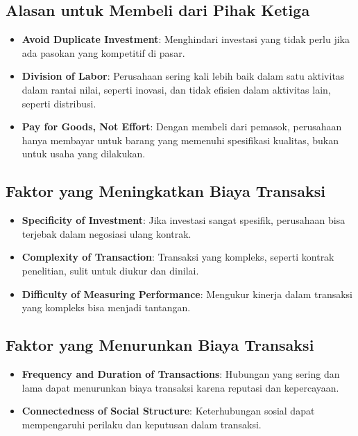 \documentclass{article}
\begin{document}
\subsection{Alasan untuk Membeli dari Pihak Ketiga}
\begin{itemize}
    \item \textbf{Avoid Duplicate Investment}: Menghindari investasi yang tidak perlu jika ada pasokan yang kompetitif di pasar.
    \item \textbf{Division of Labor}: Perusahaan sering kali lebih baik dalam satu aktivitas dalam rantai nilai, seperti inovasi, dan tidak efisien dalam aktivitas lain, seperti distribusi.
    \item \textbf{Pay for Goods, Not Effort}: Dengan membeli dari pemasok, perusahaan hanya membayar untuk barang yang memenuhi spesifikasi kualitas, bukan untuk usaha yang dilakukan.
\end{itemize}

\subsection{Faktor yang Meningkatkan Biaya Transaksi}
\begin{itemize}
    \item \textbf{Specificity of Investment}: Jika investasi sangat spesifik, perusahaan bisa terjebak dalam negosiasi ulang kontrak.
    \item \textbf{Complexity of Transaction}: Transaksi yang kompleks, seperti kontrak penelitian, sulit untuk diukur dan dinilai.
    \item \textbf{Difficulty of Measuring Performance}: Mengukur kinerja dalam transaksi yang kompleks bisa menjadi tantangan.
\end{itemize}

\subsection{Faktor yang Menurunkan Biaya Transaksi}
\begin{itemize}
    \item \textbf{Frequency and Duration of Transactions}: Hubungan yang sering dan lama dapat menurunkan biaya transaksi karena reputasi dan kepercayaan.
    \item \textbf{Connectedness of Social Structure}: Keterhubungan sosial dapat mempengaruhi perilaku dan keputusan dalam transaksi.
\end{itemize}
\end{document}

